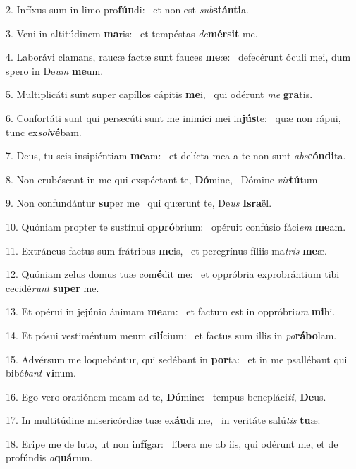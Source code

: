 2. Infíxus sum in limo pro\textbf{fún}di: \ast\  et non est \textit{sub}\textbf{stán}\textbf{ti}a.\

3. Veni in altitúdinem \textbf{ma}ris: \ast\  et tempéstas \textit{de}\textbf{mér}\textbf{sit} me.\

4. Laborávi clamans, raucæ factæ sunt fauces \textbf{me}æ: \ast\  defecérunt óculi mei, dum spero in De\textit{um} \textbf{me}um.\

5. Multiplicáti sunt super capíllos cápitis \textbf{me}i, \ast\  qui odérunt \textit{me} \textbf{gra}tis.\

6. Confortáti sunt qui persecúti sunt me inimíci mei in\textbf{jús}te: \ast\  quæ non rápui, tunc ex\textit{sol}\textbf{vé}bam.\

7. Deus, tu scis insipiéntiam \textbf{me}am: \ast\  et delícta mea a te non sunt \textit{abs}\textbf{cón}\textbf{di}ta.\

8. Non erubéscant in me qui exspéctant te, \textbf{Dó}mine, \ast\  Dómine \textit{vir}\textbf{tú}tum\

9. Non confundántur \textbf{su}per me \ast\  qui quærunt te, De\textit{us} \textbf{Is}\textbf{ra}ël.\

10. Quóniam propter te sustínui op\textbf{pró}brium: \ast\  opéruit confúsio fáci\textit{em} \textbf{me}am.\

11. Extráneus factus sum frátribus \textbf{me}is, \ast\  et peregrínus fíliis ma\textit{tris} \textbf{me}æ.\

12. Quóniam zelus domus tuæ com\textbf{é}dit me: \ast\  et oppróbria exprobrántium tibi cecidé\textit{runt} \textbf{su}\textbf{per} me.\

13. Et opérui in jejúnio ánimam \textbf{me}am: \ast\  et factum est in oppróbri\textit{um} \textbf{mi}hi.\

14. Et pósui vestiméntum meum ci\textbf{lí}cium: \ast\  et factus sum illis in \textit{pa}\textbf{rá}\textbf{bo}lam.\

15. Advérsum me loquebántur, qui sedébant in \textbf{por}ta: \ast\  et in me psallébant qui bibé\textit{bant} \textbf{vi}num.\

16. Ego vero oratiónem meam ad te, \textbf{Dó}mine: \ast\  tempus benepláci\textit{ti}, \textbf{De}us.\

17. In multitúdine misericórdiæ tuæ ex\textbf{áu}di me, \ast\  in veritáte salú\textit{tis} \textbf{tu}æ:\

18. Eripe me de luto, ut non in\textbf{fí}gar: \ast\  líbera me ab iis, qui odérunt me, et de profúndis \textit{a}\textbf{quá}rum.\


